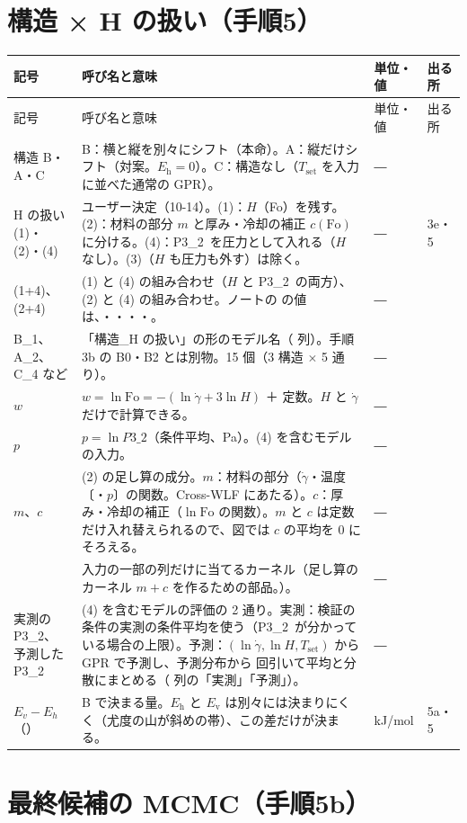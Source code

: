 \documentclass[paper=a4paper,fontsize=10.5pt,line_length=44zw,number_of_lines=38]{jlreq}
\makeatletter
\newcommand{\file}[1]{\texttt{\detokenize{#1}}}
\newcommand{\gd}{\dot{\gamma}}
\newcommand{\Tset}{T_{\mathrm{set}}}
\newcommand{\Eh}{E_{\mathrm{h}}}
\newcommand{\Ev}{E_{\mathrm{v}}}
\newcommand{\PII}{P3\_2}
\newenvironment{symtab}{%
  \begin{longtable}{@{}>{\raggedright\arraybackslash}p{6.5\zw}>{\raggedright\arraybackslash}p{22\zw}>{\raggedright\arraybackslash}p{6\zw}>{\raggedright\arraybackslash}p{4.5\zw}@{}}
  \toprule 記号 & 呼び名と意味 & 単位・値 & 出る所 \\ \midrule \endfirsthead
  \toprule 記号 & 呼び名と意味 & 単位・値 & 出る所 \\ \midrule \endhead
  \bottomrule \endlastfoot}{\end{longtable}}
\makeatother
\begin{document}
\section{構造 × H の扱い（手順5）}

\begin{symtab}
構造 B・A・C & B：横と縦を別々にシフト（本命）。A：縦だけシフト（対案。$\Eh=0$）。C：構造なし（$\Tset$ を入力に並べた通常の GPR）。 & ― & 5 \\
H の扱い (1)・(2)・(4) & ユーザー決定（10-14）。(1)：$H$（Fo）を残す。(2)：材料の部分 $m$ と厚み・冷却の補正 $c(\mathrm{Fo})$ に分ける。(4)：\PII\ を圧力として入れる（$H$ なし）。(3)（$H$ も圧力も外す）は除く。 & ― & 3e・5 \\
(1+4)、(2+4) & (1) と (4) の組み合わせ（$H$ と \PII\ の両方）、(2) と (4) の組み合わせ。ノートの \file{hv} の値は、\file{"1"}・\file{"2"}・\file{"4"}・\file{"14"}・\file{"24"}。 & ― & 5 \\
B\_1、A\_2、C\_4 など & 「構造\_H の扱い」の形のモデル名（\file{model} 列）。手順3b の B0・B2 とは別物。15 個（3 構造 $\times$ 5 通り）。 & ― & 5 \\
$w$ & $w=\ln\mathrm{Fo}=-(\ln\gd+3\ln H)$ ＋ 定数。$H$ と $\gd$ だけで計算できる。 & ― & 5 \\
$p$ & $p=\ln\PII$（条件平均、Pa）。(4) を含むモデルの入力。 & ― & 5 \\
$m$、$c$ & (2) の足し算の成分。$m$：材料の部分（$\gd$・温度〔・$p$〕の関数。Cross-WLF にあたる）。$c$：厚み・冷却の補正（$\ln\mathrm{Fo}$ の関数）。$m$ と $c$ は定数だけ入れ替えられるので、図では $c$ の平均を 0 にそろえる。 & ― & 5 \\
\file{OnDims} & 入力の一部の列だけに当てるカーネル（足し算のカーネル $m+c$ を作るための部品。\file{nb_common.py}）。 & ― & 5 \\
実測の \PII、予測した \PII & (4) を含むモデルの評価の 2 通り。実測：検証の条件の実測の条件平均を使う（\PII\ が分かっている場合の上限）。予測：$(\ln\gd,\ln H,\Tset)$ から GPR で予測し、予測分布から \file{P32_DRAWS} 回引いて平均と分散にまとめる（\file{psrc} 列の「実測」「予測」）。 & ― & 5 \\
$E_v-E_h$（\file{diff}） & B で決まる量。$\Eh$ と $\Ev$ は別々には決まりにくく（尤度の山が斜めの帯）、この差だけが決まる。 & kJ/mol & 5a・5 \\
\end{symtab}

\section{最終候補の MCMC（手順5b）}
\end{document}
